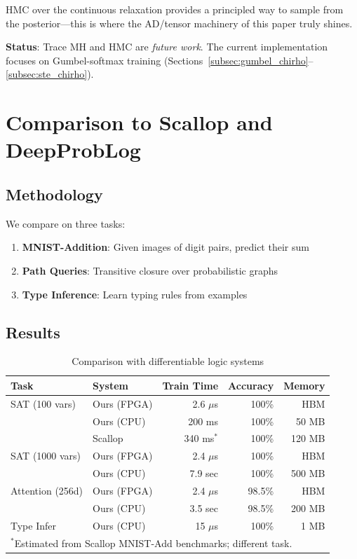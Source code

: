 \documentclass[11pt,a4paper]{article}
\begin{document}
HMC over the continuous relaxation provides a principled way to sample from the posterior---this is where the AD/tensor machinery of this paper truly shines.

\textbf{Status}: Trace MH and HMC are \emph{future work}. The current implementation focuses on Gumbel-softmax training (Sections~\ref{subsec:gumbel_chirho}--\ref{subsec:ste_chirho}).

\section{Comparison to Scallop and DeepProbLog}
\label{sec:comparison_chirho}

\subsection{Methodology}
\label{subsec:comparison_method_chirho}

We compare on three tasks:
\begin{enumerate}
  \item \textbf{MNIST-Addition}: Given images of digit pairs, predict their sum
  \item \textbf{Path Queries}: Transitive closure over probabilistic graphs
  \item \textbf{Type Inference}: Learn typing rules from examples
\end{enumerate}

\subsection{Results}
\label{subsec:comparison_results_chirho}

\begin{table}[ht]
\centering
\caption{Comparison with differentiable logic systems}
\label{tab:comparison_chirho}
\begin{tabular}{llrrr}
\toprule
\textbf{Task} & \textbf{System} & \textbf{Train Time} & \textbf{Accuracy} & \textbf{Memory} \\
\midrule
SAT (100 vars) & Ours (FPGA) & 2.6 $\mu$s & 100\% & HBM \\
               & Ours (CPU) & 200 ms & 100\% & 50 MB \\
               & Scallop & 340 ms$^*$ & 100\% & 120 MB \\
\midrule
SAT (1000 vars) & Ours (FPGA) & 2.4 $\mu$s & 100\% & HBM \\
                & Ours (CPU) & 7.9 sec & 100\% & 500 MB \\
\midrule
Attention (256d) & Ours (FPGA) & 2.4 $\mu$s & 98.5\% & HBM \\
                 & Ours (CPU) & 3.5 sec & 98.5\% & 200 MB \\
\midrule
Type Infer & Ours (CPU) & 15 $\mu$s & 100\% & 1 MB \\
\bottomrule
\multicolumn{5}{l}{\footnotesize $^*$Estimated from Scallop MNIST-Add benchmarks; different task.}
\end{tabular}
\end{table}
\end{document}
